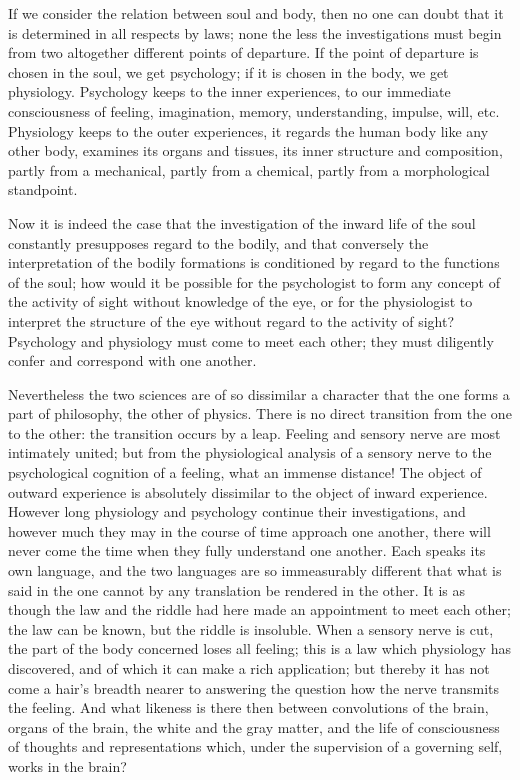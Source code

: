 \documentclass[12pt,a4paper,openany]{book}
\newcommand{\opage}[1]{\marginnote{\footnotesize\textit{[#1]}}}
\begin{document}
If we consider the relation between soul and body, then
no one can doubt that it is determined in all respects
by laws; none the less the investigations must
begin from two altogether different points of departure.
If the point of departure is chosen in the soul, we get
psychology; if it is chosen in the body, we get physiology.
Psychology keeps to the inner experiences,
to our immediate consciousness of feeling, imagination,
memory, understanding, impulse, will, etc. Physiology
keeps to the outer experiences, it regards
the human body like any other body,
examines its organs and tissues, its inner
structure and composition, partly from a mechanical, partly
from a chemical, partly from a morphological standpoint.

Now it is indeed the case that the investigation of the inward
life of the soul constantly presupposes regard to the
bodily, and that conversely the interpretation of the bodily
formations is conditioned by regard to the functions of the soul;
how would it be possible for the psychologist
to form any concept of the activity of sight
without knowledge of the eye, or for the physiologist to
interpret the structure of the eye without regard to the activity of sight?
\setcounter{footnote}{0}%
\opage{396}Psychology and physiology must come to meet each other;
they must diligently confer and correspond with one another.

Nevertheless the two sciences are of so dissimilar a
character that the one forms a part of philosophy,
the other of physics. There is no direct
transition from the one to the other: the transition occurs
by a leap. Feeling and sensory nerve are most intimately
united; but from the physiological analysis of
a sensory nerve to the psychological cognition of a feeling,
what an immense distance! The object of outward
experience is absolutely dissimilar to the object
of inward experience. However long physiology and psychology
continue their investigations, and however much they
may in the course of time approach one another, there
will never come the time when they fully understand one another.
Each speaks its own language, and the two languages are
so immeasurably different that what is said in the one
cannot by any translation be rendered in
the other. It is as though the law and the riddle had here
made an appointment to meet each other; the law can be known, but the riddle
is insoluble. When a sensory nerve is cut, the
part of the body concerned loses all feeling; this is a
law which physiology has discovered, and of which it can
make a rich application; but thereby it has not come
a hair's breadth nearer to answering the question how the nerve
transmits the feeling. And what
likeness is there then between convolutions of the brain, organs of the brain,
the white and the gray matter, and the life of consciousness
of thoughts and representations which, under the supervision of a governing
self, works in the brain?
\end{document}
